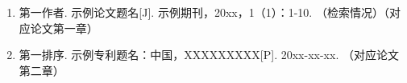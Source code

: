 \documentclass[blindreview=false]{neudissertation}
\begin{document}
\makeneucovers

\frontmatter

\makeneudeclaration

\begin{abstractcn}
  
\end{abstractcn}

\begin{abstracten}
  
\end{abstracten}

\tableofcontents

\mainmatter









\backmatter

\begin{referencescn}
  
\end{referencescn}

\begin{achievementscn}
  \begin{enumerate}
    \item 第一作者. 示例论文题名[J]. 示例期刊，20xx，1（1）：1-10. （检索情况）（对应论文第一章）
    \item 第一排序. 示例专利题名：中国，XXXXXXXXX[P]. 20xx-xx-xx. （对应论文第二章）
  \end{enumerate}
\end{achievementscn}


\end{document}
